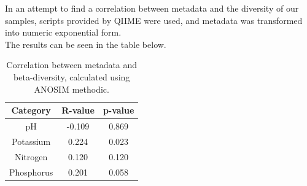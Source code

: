 \documentclass{article}
\begin{document}
\begin{multicols}{2}
\begin{figure}[H]
	\label{fig:sourcetracker_heatmap}
\end{figure}
In an attempt to find a correlation between metadata and the diversity of our samples, scripts provided by QIIME were used, and metadata was transformed into numeric exponential form. \\
The results can be seen in the table below.
\begin{table}[H]
	\begin{center}
		\label{tab:table_correlation}
		\begin{tabular}{c|c|c}
			\textbf{Category} & \textbf{R-value} & \textbf{p-value}\\
			\hline
			pH & -0.109 & 0.869\\
			Potassium & 0.224 & 0.023\\
			Nitrogen & 0.120 & 0.120 \\
			Phosphorus & 0.201 & 0.058\\
		\end{tabular}
	\caption{Correlation between metadata and beta-diversity, calculated using ANOSIM\cite{CLARKE1993} methodic.}
	\end{center}
\end{table}

\end{multicols}
\end{document}
